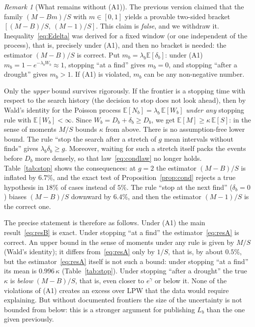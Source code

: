 \documentclass[11pt,a4paper]{article}
\theoremstyle{plain}
\theoremstyle{remark}
\newtheorem{remark}{Remark}
\newcommand{\eg}{e^{\gamma}}
\begin{document}
\begin{remark}[What remains without (A1)]\label{rem:bracket}
The previous version claimed that the family $(M-Bm)/S$ with $m\in[0,1]$ yields a
provable two-sided bracket $[(M-B)/S,\ (M-1)/S]$. This claim is \emph{false},
and we withdraw it. Inequality~\eqref{eq:Edelta} was derived for a fixed window
(or one independent of the process), that is, precisely under (A1), and then no
bracket is needed: the estimator $(M-B)/S$ is correct. Put
$m_b=\lambda_b\mathbb E[\delta_b]$: under (A1) $m_b=1-e^{-\lambda_bW_b}\approx1$,
stopping ``at a find'' gives $m_b=0$, and stopping ``after a drought'' gives
$m_b>1$. If (A1) is violated, $m_b$ can be any non-negative number.

Only the \emph{upper} bound survives rigorously. If the frontier is a stopping
time with respect to the search history (the decision to stop does not look
ahead), then by Wald's identity for the Poisson process
$\mathbb E[N_b]=\lambda_b\,\mathbb E[W_b]$ \emph{under any} stopping rule with
$\mathbb E[W_b]<\infty$. Since $W_b=D_b+\delta_b\ge D_b$, we get
$\mathbb E[M]\ge\kappa\,\mathbb E[S]$: in the sense of moments $M/S$ bounds
$\kappa$ from above. There is no assumption-free lower bound. The rule ``stop
the search after a stretch of $g$ mean intervals without finds'' gives
$\lambda_b\delta_b\ge g$. Moreover, waiting for such a stretch itself packs the
events before $D_b$ more densely, so that law~\eqref{eq:condlaw} no longer holds.
Table~\ref{tab:stop} shows the consequences: at $g=2$ the estimator $(M-B)/S$ is
inflated by $6.7\%$, and the exact test of Proposition~\ref{prop:cond} rejects a
true hypothesis in $18\%$ of cases instead of $5\%$. The rule ``stop at the next
find'' ($\delta_b=0$) biases $(M-B)/S$ downward by $6.4\%$, and then the
estimator $(M-1)/S$ is the correct one.

The precise statement is therefore as follows. Under (A1) the main
result~\eqref{eq:resB} is exact. Under stopping ``at a find'' the
estimator~\eqref{eq:resA} is correct. An upper bound in the sense of moments
under any rule is given by $M/S$ (Wald's identity); it differs
from~\eqref{eq:resA} only by $1/S$, that is, by about $0.5\%$, but the
estimator~\eqref{eq:resA} itself is not such a bound: under stopping ``at a
find'' its mean is $0.996\,\kappa$ (Table~\ref{tab:stop}). Under stopping
``after a drought'' the true
$\kappa$ is \emph{below} $(M-B)/S$, that is, even closer to $\eg$ or below it.
None of the violations of (A1) creates an excess over LPW that the data would
require explaining. But without documented frontiers the size of the
uncertainty is not bounded from below: this is a stronger argument for
publishing $L_b$ than the one given previously.
\end{remark}
\end{document}
